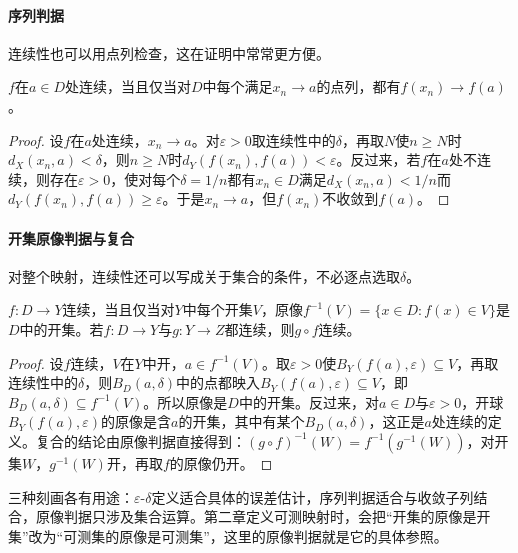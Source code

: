 \paragraph{序列判据}
连续性也可以用点列检查，这在证明中常常更方便。

\begin{theorem}[连续性的序列判据]
\label{thm:metric-sequential-continuity}
$f$在$a\in D$处连续，当且仅当对$D$中每个满足$x_n\to a$的点列，都有$f(x_n)\to f(a)$。
\end{theorem}

\begin{proof}
设$f$在$a$处连续，$x_n\to a$。对$\varepsilon>0$取连续性中的$\delta$，再取$N$使$n\geq N$时$d_X(x_n,a)<\delta$，则$n\geq N$时$d_Y(f(x_n),f(a))<\varepsilon$。反过来，若$f$在$a$处不连续，则存在$\varepsilon>0$，使对每个$\delta=1/n$都有$x_n\in D$满足$d_X(x_n,a)<1/n$而$d_Y(f(x_n),f(a))\geq\varepsilon$。于是$x_n\to a$，但$f(x_n)$不收敛到$f(a)$。
\end{proof}

\paragraph{开集原像判据与复合}
对整个映射，连续性还可以写成关于集合的条件，不必逐点选取$\delta$。

\begin{theorem}[开集原像判据]
\label{thm:metric-open-preimage}
$f:D\to Y$连续，当且仅当对$Y$中每个开集$V$，原像$f^{-1}(V)=\{x\in D:f(x)\in V\}$是$D$中的开集。若$f:D\to Y$与$g:Y\to Z$都连续，则$g\circ f$连续。
\end{theorem}

\begin{proof}
设$f$连续，$V$在$Y$中开，$a\in f^{-1}(V)$。取$\varepsilon>0$使$B_Y(f(a),\varepsilon)\subseteq V$，再取连续性中的$\delta$，则$B_D(a,\delta)$中的点都映入$B_Y(f(a),\varepsilon)\subseteq V$，即$B_D(a,\delta)\subseteq f^{-1}(V)$。所以原像是$D$中的开集。反过来，对$a\in D$与$\varepsilon>0$，开球$B_Y(f(a),\varepsilon)$的原像是含$a$的开集，其中有某个$B_D(a,\delta)$，这正是$a$处连续的定义。复合的结论由原像判据直接得到：$(g\circ f)^{-1}(W)=f^{-1}(g^{-1}(W))$，对开集$W$，$g^{-1}(W)$开，再取$f$的原像仍开。
\end{proof}

三种刻画各有用途：$\varepsilon$-$\delta$定义适合具体的误差估计，序列判据适合与收敛子列结合，原像判据只涉及集合运算。第二章定义可测映射时，会把“开集的原像是开集”改为“可测集的原像是可测集”，这里的原像判据就是它的具体参照。

